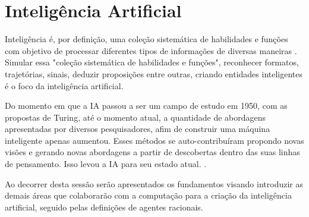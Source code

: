 \section{Inteligência Artificial}

Inteligência é, por definição, uma coleção sistemática de habilidades e funções com objetivo de processar diferentes tipos de informações de diversas maneiras \cite[49]{guilford1982cognitive}. Simular essa "coleção sistemática de habilidades e funções", reconhecer formatos, trajetórias, sinais, deduzir proposições entre outras, criando entidades inteligentes é o foco da inteligência artificial.

Do momento em que a IA passou a ser um campo de estudo em 1950, com as propostas de Turing, até o momento atual, a quantidade de abordagens apresentadas por diversos pesquisadores, afim de construir uma máquina inteligente apenas aumentou. Esses métodos se auto-contribuíram propondo novas visões e gerando novas abordagens a partir de descobertas dentro das suas linhas de pensamento. Isso levou a IA para seu estado atual. \cite[1-2]{russell2003artificial}.

Ao decorrer desta sessão serão apresentados os fundamentos visando introduzir as demais áreas que colaborarão com a computação para a criação da inteligência artificial, seguido pelas definições de agentes racionais.



